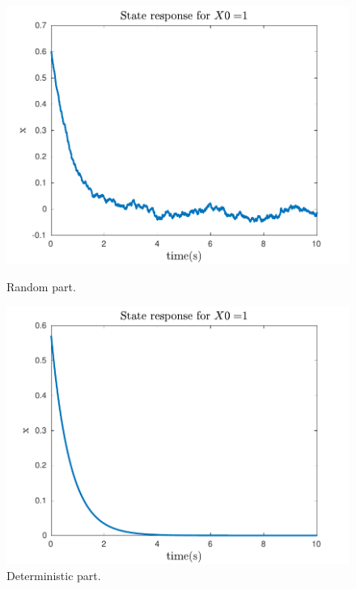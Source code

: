 \documentclass{article}
\begin{document}
\begin{figure}[H]
  \centering
  \begin{minipage}[b]{0.45\textwidth}
    \includegraphics[width=\textwidth]{fig3}
	\caption{Random part.}
  \end{minipage}
  \hfill
  \begin{minipage}[b]{0.45\textwidth}
    \includegraphics[width=\textwidth]{fig8}
	\caption{Deterministic part.}
  \end{minipage}
\end{figure}
\end{document}
